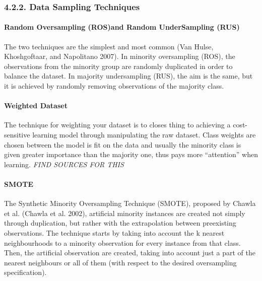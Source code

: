 \documentclass[12pt,]{article}
\let\oldparagraph\paragraph
\renewcommand{\paragraph}[1]{\oldparagraph{#1}\mbox{}}
\begin{document}
\hypertarget{data-sampling-techniques}{%
\subsubsection{4.2.2. Data Sampling
Techniques}\label{data-sampling-techniques}}

\hypertarget{random-oversampling-rosand-random-undersampling-rus}{%
\paragraph{Random Oversampling (ROS)and Random UnderSampling
(RUS)}\label{random-oversampling-rosand-random-undersampling-rus}}

The two techniques are the simplest and most common (Van Hulse,
Khoshgoftaar, and Napolitano 2007). In minority oversampling (ROS), the
observations from the minority group are randomly duplicated in order to
balance the dataset. In majority undersampling (RUS), the aim is the
same, but it is achieved by randomly removing observations of the
majority class.

\hypertarget{weighted-dataset}{%
\paragraph{Weighted Dataset}\label{weighted-dataset}}

The technique for weighting your dataset is to closes thing to achieving
a cost-sensitive learning model through manipulating the raw dataset.
Class weights are chosen between the model is fit on the data and
usually the minority class is given greater importance than the majority
one, thus pays more ``attention'' when learning. \emph{FIND SOURCES FOR
THIS}

\hypertarget{smote}{%
\paragraph{SMOTE}\label{smote}}

The Synthetic Minority Oversampling Technique (SMOTE), proposed by
Chawla et al. (Chawla et al. 2002), artificial minority instances are
created not simply through duplication, but rather with the
extrapolation between preexisting observations. The technique starts by
taking into account the k nearest neighbourhoods to a minority
observation for every instance from that class. Then, the artificial
observation are created, taking into account just a part of the nearest
neighbours or all of them (with respect to the desired oversampling
specification).
\end{document}
